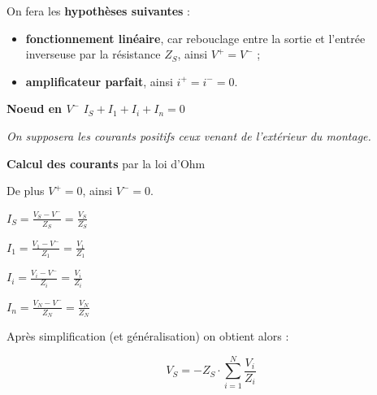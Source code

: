 \documentclass[a4paper,french]{paper}
\begin{document}
On fera les \textbf{hypothèses suivantes} :
\begin{itemize}
	\item \textbf{fonctionnement linéaire}, car rebouclage entre la sortie et l'entrée inverseuse par la résistance $Z_S$, ainsi $V^+ = V^-$ ;
	\item \textbf{amplificateur parfait}, ainsi $i^+ = i^- = 0$. 
\end{itemize}

\medskip

\textbf{Noeud en $V^-$} $I_S + I_1 + I_i + I_n = 0$

\textit{On supposera les courants positifs ceux venant de l'extérieur du montage.}

\medskip

\textbf{Calcul des courants} par la loi d'Ohm

De plus $V^+ = 0$, ainsi $V^- = 0$.

$I_S = \frac{V_S - V^-}{Z_S} = \frac{V_S}{Z_S}$

$I_1 = \frac{V_1 - V^-}{Z_1} = \frac{V_1}{Z_1}$

$I_i = \frac{V_i - V^-}{Z_i} = \frac{V_i}{Z_i}$

$I_n = \frac{V_N - V^-}{Z_N} = \frac{V_N}{Z_N}$

\medskip

Après simplification (et généralisation) on obtient alors :

$$V_{S} = - Z_S \cdot \sum_{i=1}^{N} \frac{V_i}{Z_i} $$



\end{document}
